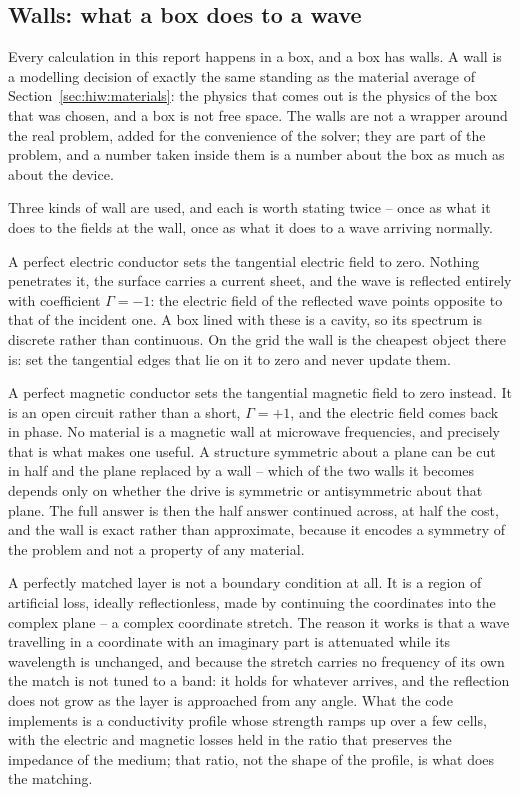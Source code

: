 \subsection{Walls: what a box does to a wave}\label{sec:hiw:walls}

Every calculation in this report happens in a box, and a box has walls. A wall is a modelling decision of
exactly the same standing as the material average of Section~\ref{sec:hiw:materials}: the physics that comes
out is the physics of the box that was chosen, and a box is not free space. The walls are not a wrapper around
the real problem, added for the convenience of the solver; they are part of the problem, and a number taken
inside them is a number about the box as much as about the device.

Three kinds of wall are used, and each is worth stating twice -- once as what it does to the fields at the
wall, once as what it does to a wave arriving normally.

A perfect electric conductor sets the tangential electric field to zero. Nothing penetrates it, the surface
carries a current sheet, and the wave is reflected entirely with coefficient $\Gamma=-1$: the electric field of
the reflected wave points opposite to that of the incident one. A box lined with these is a cavity, so its
spectrum is discrete rather than continuous. On the grid the wall is the cheapest object there is: set the
tangential edges that lie on it to zero and never update them.

A perfect magnetic conductor sets the tangential magnetic field to zero instead. It is an open circuit rather
than a short, $\Gamma=+1$, and the electric field comes back in phase. No material is a magnetic wall at
microwave frequencies, and precisely that is what makes one useful. A structure symmetric about a plane can be
cut in half and the plane replaced by a wall -- which of the two walls it becomes depends only on whether the
drive is symmetric or antisymmetric about that plane. The full answer is then the half answer continued
across, at half the cost, and the wall is exact rather than approximate, because it encodes a symmetry of the
problem and not a property of any material.

A perfectly matched layer is not a boundary condition at all. It is a region of artificial loss, ideally
reflectionless, made by continuing the coordinates into the complex plane -- a complex coordinate stretch. The
reason it works is that a wave travelling in a coordinate with an imaginary part is attenuated while its
wavelength is unchanged, and because the stretch carries no frequency of its own the match is not tuned to a
band: it holds for whatever arrives, and the reflection does not grow as the layer is approached from any
angle. What the code implements is a conductivity profile whose strength ramps up over a few cells, with the
electric and magnetic losses held in the ratio that preserves the impedance of the medium; that ratio, not the
shape of the profile, is what does the matching.

